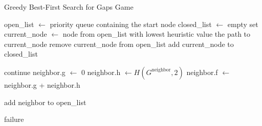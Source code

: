 \begin{algorithm}[H]
    \caption{Greedy Best-First Search for Gaps Game}
    \begin{algorithmic}
    \State open\_list $\gets$ priority queue containing the start node
    \State closed\_list $\gets$ empty set
    \State current\_node $\gets$ node from open\_list with lowest heuristic value
        \State \Return the path to current\_node
    \EndIf
    \State remove current\_node from open\_list
    \State add current\_node to closed\_list

            \State continue
        \EndIf
        \State neighbor.g $\gets$ 0 
        \State neighbor.h $\gets H(G^{\text{neighbor}}, 2)$ 
        \State neighbor.f $\gets$ neighbor.g + neighbor.h 

            \State add neighbor to open\_list
        \EndIf
    \EndFor
\EndWhile

\State \Return failure
\end{algorithmic}
\end{algorithm}
